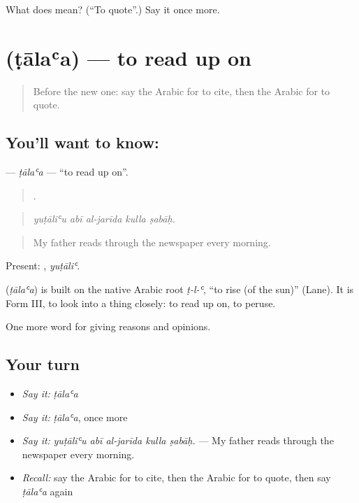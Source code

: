 \begin{tcolorbox}[breakable,colback=teal!4,colframe=teal!35!black,title={Before you move on}]
What does  mean? (\textquotedblleft{}To quote\textquotedblright{}.) Say it once more.
\end{tcolorbox}
\section[\texorpdfstring{\ar{طالع} (ṭālaʿa)}{طالع (ṭālaʿa)}]{ (ṭālaʿa) — to read up on}

\label{lesson:AR-C395-talaa}



\begin{quote}
Before the new one: say the Arabic for to cite, then the Arabic for to quote.
\end{quote}

\subsection*{You'll want to know: }
\textbf{} — \emph{ṭālaʿa} — \textquotedblleft{}to read up on\textquotedblright{}.

\begin{quote}
    .
\end{quote}

\begin{quote}
\emph{yuṭāliʿu abī al-jarīda kulla ṣabāḥ.}
\end{quote}

\begin{quote}
My father reads through the newspaper every morning.
\end{quote}

Present: , \emph{yuṭāliʿ}.

\begin{cousinweb}
\textbf{} (\emph{ṭālaʿa}) is built on the native Arabic root \emph{ṭ-l-ʿ}, \textquotedblleft{}to rise (of the sun)\textquotedblright{} (Lane). It is Form III, to look into a thing closely: to read up on, to peruse.
\end{cousinweb}

\begin{grammarlens}[title={What you've built}]
One more word for giving reasons and opinions.
\end{grammarlens}

\subsection*{Your turn}
\begin{itemize}
\raggedright
  \item \emph{Say it:} \emph{ṭālaʿa}
  \item \emph{Say it:} \emph{ṭālaʿa}, once more
  \item \emph{Say it:} \emph{yuṭāliʿu abī al-jarīda kulla ṣabāḥ.} — My father reads through the newspaper every morning.
  \item \emph{Recall:} say the Arabic for to cite, then the Arabic for to quote, then say \emph{ṭālaʿa} again
\end{itemize}

